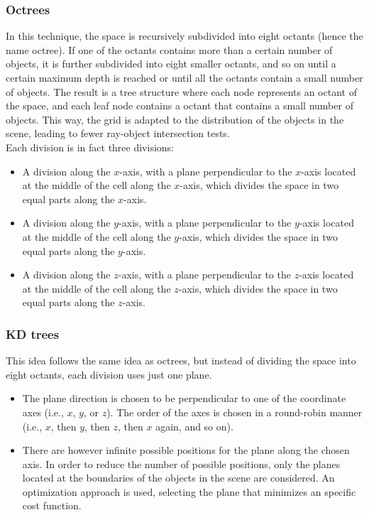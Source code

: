 \subsubsection{Octrees}

In this technique, the space is recursively subdivided into eight octants (hence the name octree). If one of the octants contains more than a certain number of objects, it is further subdivided into eight smaller octants, and so on until a certain maximum depth is reached or until all the octants contain a small number of objects. The result is a tree structure where each node represents an octant of the space, and each leaf node contains a octant that contains a small number of objects. This way, the grid is adapted to the distribution of the objects in the scene, leading to fewer ray-object intersection tests.\\

Each division is in fact three divisions:
\begin{itemize}
    \item A division along the $x$-axis, with a plane perpendicular to the $x$-axis located at the middle of the cell along the $x$-axis, which divides the space in two equal parts along the $x$-axis.
    \item A division along the $y$-axis, with a plane perpendicular to the $y$-axis located at the middle of the cell along the $y$-axis, which divides the space in two equal parts along the $y$-axis.
    \item A division along the $z$-axis, with a plane perpendicular to the $z$-axis located at the middle of the cell along the $z$-axis, which divides the space in two equal parts along the $z$-axis.
\end{itemize}

\subsubsection{KD trees}

This idea follows the same idea as octrees, but instead of dividing the space into eight octants, each division uses just one plane.
\begin{itemize}
    \item The plane direction is chosen to be perpendicular to one of the coordinate axes (i.e., $x$, $y$, or $z$). The order of the axes is chosen in a round-robin manner (i.e., $x$, then $y$, then $z$, then $x$ again, and so on).
    \item There are however infinite possible positions for the plane along the chosen axis. In order to reduce the number of possible positions, only the planes located at the boundaries of the objects in the scene are considered. An optimization approach is used, selecting the plane that minimizes an specific cost function.
\end{itemize}

